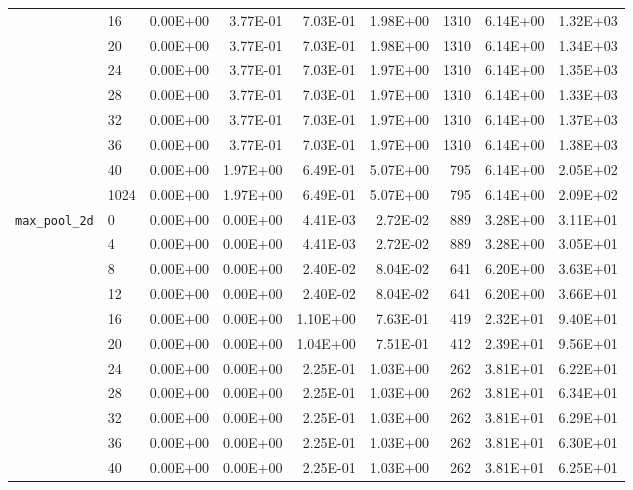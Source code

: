 \begin{longtable}{llrrrrrrr}
         & 16   &   0.00E+00 & 3.77E-01 & 7.03E-01 & 1.98E+00 &    1310 &     6.14E+00 & 1.32E+03 \\
         & 20   &   0.00E+00 & 3.77E-01 & 7.03E-01 & 1.98E+00 &    1310 &     6.14E+00 & 1.34E+03 \\
         & 24   &   0.00E+00 & 3.77E-01 & 7.03E-01 & 1.97E+00 &    1310 &     6.14E+00 & 1.35E+03 \\
         & 28   &   0.00E+00 & 3.77E-01 & 7.03E-01 & 1.97E+00 &    1310 &     6.14E+00 & 1.33E+03 \\
         & 32   &   0.00E+00 & 3.77E-01 & 7.03E-01 & 1.97E+00 &    1310 &     6.14E+00 & 1.37E+03 \\
         & 36   &   0.00E+00 & 3.77E-01 & 7.03E-01 & 1.97E+00 &    1310 &     6.14E+00 & 1.38E+03 \\
         & 40   &   0.00E+00 & 1.97E+00 & 6.49E-01 & 5.07E+00 &     795 &     6.14E+00 & 2.05E+02 \\
         & 1024 &   0.00E+00 & 1.97E+00 & 6.49E-01 & 5.07E+00 &     795 &     6.14E+00 & 2.09E+02 \\
\texttt{max\_pool\_2d} & 0    &   0.00E+00 & 0.00E+00 & 4.41E-03 & 2.72E-02 &     889 &     3.28E+00 & 3.11E+01 \\
         & 4    &   0.00E+00 & 0.00E+00 & 4.41E-03 & 2.72E-02 &     889 &     3.28E+00 & 3.05E+01 \\
         & 8    &   0.00E+00 & 0.00E+00 & 2.40E-02 & 8.04E-02 &     641 &     6.20E+00 & 3.63E+01 \\
         & 12   &   0.00E+00 & 0.00E+00 & 2.40E-02 & 8.04E-02 &     641 &     6.20E+00 & 3.66E+01 \\
         & 16   &   0.00E+00 & 0.00E+00 & 1.10E+00 & 7.63E-01 &     419 &     2.32E+01 & 9.40E+01 \\
         & 20   &   0.00E+00 & 0.00E+00 & 1.04E+00 & 7.51E-01 &     412 &     2.39E+01 & 9.56E+01 \\
         & 24   &   0.00E+00 & 0.00E+00 & 2.25E-01 & 1.03E+00 &     262 &     3.81E+01 & 6.22E+01 \\
         & 28   &   0.00E+00 & 0.00E+00 & 2.25E-01 & 1.03E+00 &     262 &     3.81E+01 & 6.34E+01 \\
         & 32   &   0.00E+00 & 0.00E+00 & 2.25E-01 & 1.03E+00 &     262 &     3.81E+01 & 6.29E+01 \\
         & 36   &   0.00E+00 & 0.00E+00 & 2.25E-01 & 1.03E+00 &     262 &     3.81E+01 & 6.30E+01 \\
         & 40   &   0.00E+00 & 0.00E+00 & 2.25E-01 & 1.03E+00 &     262 &     3.81E+01 & 6.25E+01 \\

\end{longtable}

